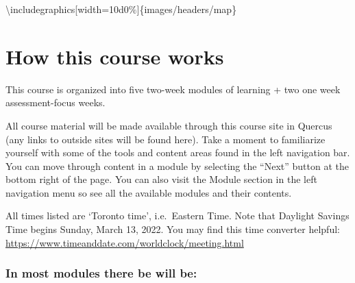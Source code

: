 \documentclass[
]{book}
\begin{document}
\textbackslash includegraphics{[}width=10d0\%{]}\{images/headers/map\}

\hypertarget{howthiscourseworks}{%
\section{How this course works}\label{howthiscourseworks}}

This course is organized into five two-week modules of learning + two one week assessment-focus weeks.

All course material will be made available through this course site in Quercus (any links to outside sites will be found here). Take a moment to familiarize yourself with some of the tools and content areas found in the left navigation bar. You can move through content in a module by selecting the ``Next'' button at the bottom right of the page. You can also visit the Module section in the left navigation menu so see all the available modules and their contents.

All times listed are `Toronto time', i.e.~Eastern Time. Note that Daylight Savings Time begins Sunday, March 13, 2022. You may find this time converter helpful: \url{https://www.timeanddate.com/worldclock/meeting.html}

\hypertarget{in-most-modules-there-be-will-be}{%
\subsubsection{\texorpdfstring{\textbf{In most modules there be will be:}}{In most modules there be will be:}}\label{in-most-modules-there-be-will-be}}
\end{document}
